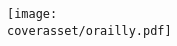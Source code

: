 \documentclass[dvipdfmx,uplatex,a5paper,tombow]{jsarticle}
\newcommand{\assetspath}{../assets}
\newcommand{\coverasset}{\assetspath/coverasset}
\begin{document}
    \centering
    \texttt{[image: \\coverasset/orailly.pdf]}
\end{document}
